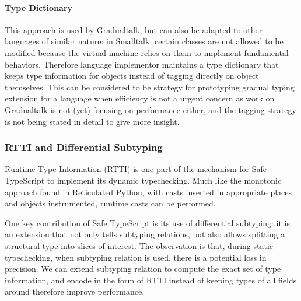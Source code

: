 \paragraph{Type Dictionary}

This approach is used by Gradualtalk, but can also be adapted to other languages of similar nature:
in Smalltalk, certain classes are not allowed to be modified because
the virtual machine relies on them to implement fundamental behaviors.
Therefore language implementor maintains a type dictionary that keeps type information for objects
instead of tagging directly on object themselves.
This can be considered to be strategy for prototyping gradual typing extension for a language when
efficiency is not a urgent concern as work on Gradualtalk is not (yet) focusing on performance either,
and the tagging strategy is not being stated in detail to give more insight.

\subsubsection{RTTI and Differential Subtyping}

Runtime Type Information (RTTI) is one part of the mechanism for Safe TypeScript
to implement its dynamic typechecking. Much like the monotonic approach found in Reticulated Python,
with casts inserted in appropriate places and objects instrumented, runtime casts can be performed.

One key contribution of Safe TypeScript is its use of differential subtyping:
it is an extension that not only tells subtyping relations, but also allows splitting
a structural type into slices of interest.
The observation is that, during static typechecking, when subtyping relation is used, there is a potential loss in precision. We can extend subtyping relation to compute the exact set of type information,
and encode in the form of RTTI instead of keeping types of all fields around therefore improve performance.





